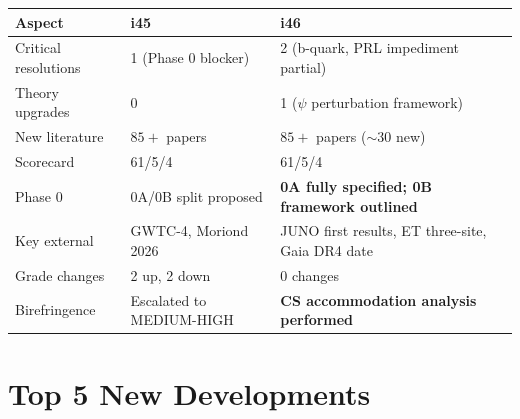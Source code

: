 \documentclass[11pt,a4paper]{article}
\begin{document}
\begin{center}
\begin{tabular}{lll}
\toprule
\textbf{Aspect} & \textbf{i45} & \textbf{i46} \\
\midrule
Critical resolutions & 1 (Phase 0 blocker) & 2 (b-quark, PRL impediment partial) \\
Theory upgrades & 0 & 1 ($\psi$ perturbation framework) \\
New literature & $85+$ papers & $85+$ papers ($\sim$30 new) \\
Scorecard & 61/5/4 & 61/5/4 \\
Phase 0 & 0A/0B split proposed & \textbf{0A fully specified; 0B framework outlined} \\
Key external & GWTC-4, Moriond 2026 & JUNO first results, ET three-site, Gaia DR4 date \\
Grade changes & 2 up, 2 down & 0 changes \\
Birefringence & Escalated to MEDIUM-HIGH & \textbf{CS accommodation analysis performed} \\
\bottomrule
\end{tabular}
\end{center}

\section{Top 5 New Developments}
\end{document}
